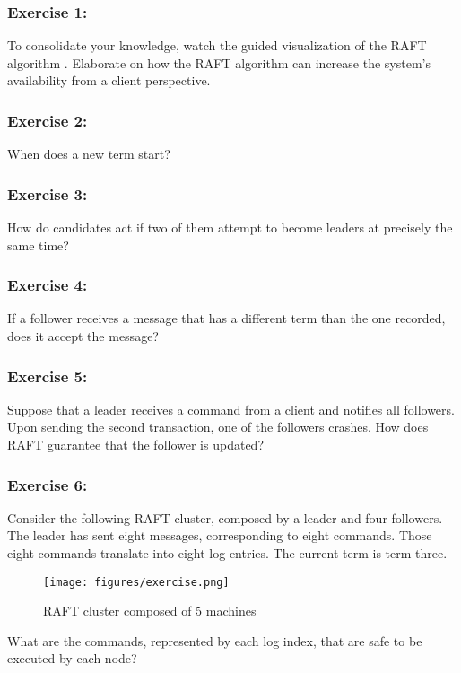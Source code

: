 \documentclass[12pt,a4paper]{article}
\begin{document}
\subsubsection*{Exercise 1:} To consolidate your knowledge, watch the guided visualization of the RAFT algorithm \cite{raft_viz}. 
Elaborate on how the RAFT algorithm can increase the system's availability from a client perspective.

\subsubsection*{Exercise 2:} When does a new term start? 



\subsubsection*{Exercise 3:} How do candidates act if two of them attempt to become leaders at precisely the same time?


\subsubsection*{Exercise 4:} If a follower receives a message that has a different term than the one recorded, does it accept the message?  

\subsubsection*{Exercise 5:} Suppose that a leader receives a command from a client and notifies all followers. Upon sending the second transaction, one of the followers crashes. How does RAFT guarantee that the follower is updated?



\subsubsection*{Exercise 6:} Consider the following RAFT cluster, composed by a leader and four followers. The leader has sent eight messages, corresponding to eight commands. Those eight commands translate into eight log entries. The current term is term three. 
\begin{figure}[H]
    \centering
    \texttt{[image: figures/exercise.png]}
    \caption{RAFT cluster composed of 5 machines}
    \label{fig:RAFT_cluster}
\end{figure}

What are the commands, represented by each log index, that are safe to be executed by each node?
\end{document}
